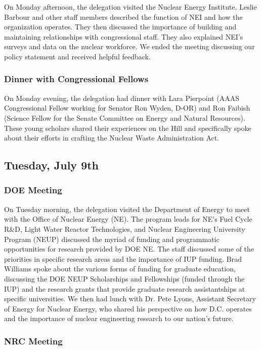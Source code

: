 On Monday afternoon, the delegation visited the Nuclear Energy Institute. Leslie
Barbour and other staff members described the function of NEI and how the
organization operates. They then discussed the importance of building and
maintaining relationships with congressional staff. They also explained NEI's
surveys and data on the nuclear workforce. We ended the meeting discussing our
policy statement and received helpful feedback.

\subsubsection*{Dinner with Congressional Fellows}

On Monday evening, the delegation had dinner with Lara Pierpoint (AAAS
Congressional Fellow working for Senator Ron Wyden, D-OR) and Ron Faibish
(Science Fellow for the Senate Committee on Energy and Natural Resources). These
young scholars shared their experiences on the Hill and specifically spoke about
their efforts in crafting the Nuclear Waste Administration Act.

\subsection*{Tuesday, July 9th}

\subsubsection*{DOE Meeting}

On Tuesday morning, the delegation visited the Department of Energy to meet with
the Office of Nuclear Energy (NE). The program leads for NE's Fuel Cycle R\&D,
Light Water Reactor Technologies, and Nuclear Engineering University Program
(NEUP) discussed the myriad of funding and programmatic opportunities for
research provided by DOE NE. The staff discussed some of the priorities in
specific research areas and the importance of IUP funding. Brad Williams spoke
about the various forms of funding for graduate education, discussing the DOE
NEUP Scholarships and Fellowships (funded through the IUP) and the research
grants that provide graduate research assistantships at specific
universities. We then had lunch with Dr. Pete Lyons, Assistant Secretary of
Energy for Nuclear Energy, who shared his perspective on how D.C. operates and
the importance of nuclear engineering research to our nation's future.

\subsubsection*{NRC Meeting}

